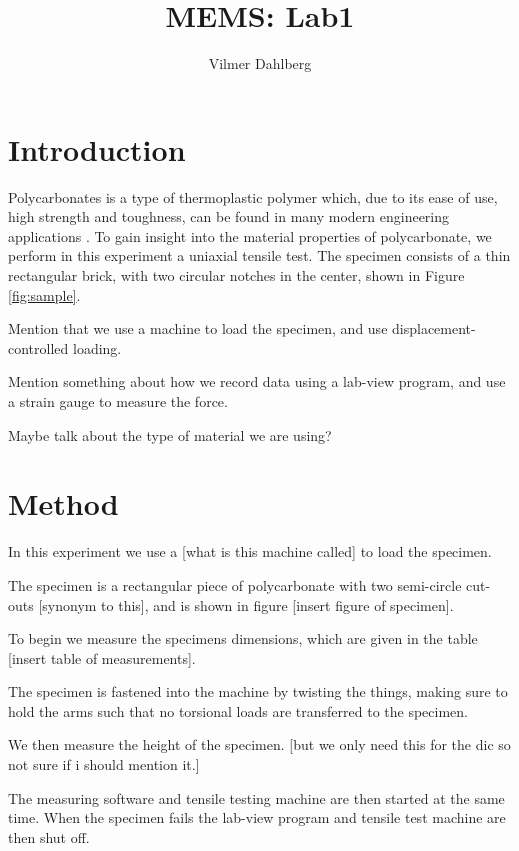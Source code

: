 \documentclass[]{article}
\title{MEMS: Lab1}
\author{Vilmer Dahlberg}
\begin{document}
\maketitle

\begin{abstract}

\end{abstract}

\section{Introduction}
Polycarbonates is a type of thermoplastic polymer which, due to its ease of use, high strength and toughness, can be found in many modern engineering applications \citet{wikipedia_polycarbonate}. To gain insight into the material properties of polycarbonate, we perform in this experiment a uniaxial tensile test. The specimen consists of a thin rectangular brick, with two circular notches in the center, shown in Figure \ref{fig:sample}.

Mention that we use a machine to load the specimen, and use displacement-controlled loading.

Mention something about how we record data using a lab-view program, and use a strain gauge to measure the force. 

Maybe talk about the type of material we are using?

\section{Method}
In this experiment we use a [what is this machine called] to load the specimen.

The specimen is a rectangular piece of polycarbonate with two semi-circle cut-outs [synonym to this], and is shown in figure [insert figure of specimen].

To begin we measure the specimens dimensions, which are given in the table [insert table of measurements].

The specimen is fastened into the machine by twisting the things, making sure to hold the arms such that no torsional loads are transferred to the specimen.

We then measure the height of the specimen. [but we only need this for the dic so not sure if i should mention it.]

The measuring software and tensile testing machine are then started at the same time. When the specimen fails the lab-view program and tensile test machine are then shut off.
\end{document}
